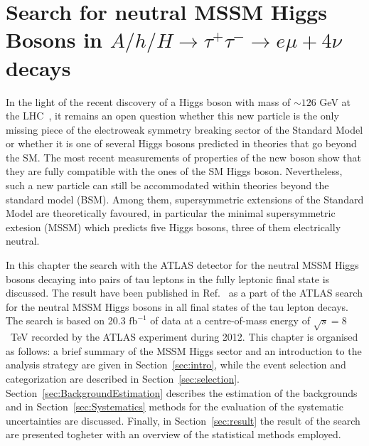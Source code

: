 \chapter[Neutral MSSM Higgs Bosons Search]{Search for neutral MSSM Higgs Bosons in  
$A/h/H \rightarrow \tau^{+}\tau^{-} \rightarrow e \mu + 4\nu$ decays} \label{chap:anal}


%
 \vspace{0.5cm}

%
%
In the light of the recent discovery of a Higgs 
boson with mass of $\sim 126$ GeV at the LHC~\cite{AHiggsO,CHiggsO}, it remains an open question
whether this new particle is the only missing piece of the electroweak symmetry breaking
sector of the Standard Model or whether it is one of several Higgs bosons predicted in  theories 
that go beyond the SM. The most recent measurements \cite{ASpin0,ACouplings,CFermions,CWidth} of 
properties of the new boson show that they are fully compatible with the ones of the SM Higgs boson. 
Nevertheless, such a new particle can still be accommodated within theories beyond the 
standard model (BSM). Among  them, supersymmetric extensions of the Standard Model are theoretically favoured,
in particular the minimal supersymmetric extesion (MSSM) which predicts five Higgs bosons, three of them electrically neutral.

In this chapter  the search  with the ATLAS detector for the neutral MSSM Higgs bosons decaying into pairs of tau leptons
in the fully leptonic final state is discussed. 
The result have been published in Ref.~\cite{yuppy} as a part of the ATLAS search for the neutral
MSSM Higgs bosons in all final states of the tau lepton decays. 
The search is based on 20.3 $\text{fb}^{-1}$ of  data at a centre-of-mass energy of $\sqrt{s} = 8$~TeV
recorded by the ATLAS experiment during 2012.
This chapter is organised as follows: a brief summary of the MSSM Higgs sector 
and an introduction to the analysis strategy are given in Section~\ref{sec:intro},
while the event selection and categorization are described in Section~\ref{sec:selection}. 
Section~\ref{sec:BackgroundEstimation} describes the estimation of the backgrounds and
in Section~\ref{sec:Systematics} methods for the evaluation of the  systematic uncertainties are discussed. Finally, 
in Section~\ref{sec:result} the result of the search are presented togheter with an overview of the statistical methods employed.


